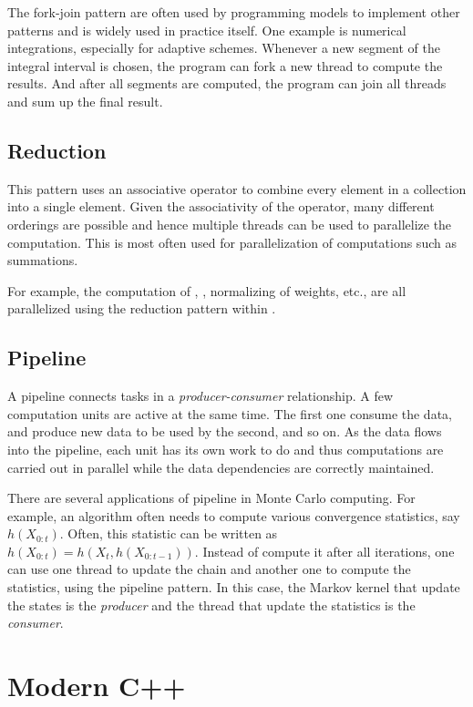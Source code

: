The fork-join pattern are often used by programming models to implement other patterns and is widely used in practice itself. One example is numerical integrations, especially for adaptive schemes. Whenever a new segment of the integral interval is chosen, the program can fork a new thread to compute the results. And after all segments are computed, the program can join all threads and sum up the final result.

\subsection{Reduction}
\label{sub:Reduction}

This pattern uses an associative operator to combine every element in a collection into a single element. Given the associativity of the operator, many different orderings are possible and hence multiple threads can be used to parallelize the computation. This is most often used for parallelization of computations such as summations.

For example, the computation of \ess, \cess, normalizing of weights, etc., are all parallelized using the reduction pattern within \vsmc.

\subsection{Pipeline}
\label{sub:Pipeline}

A pipeline connects tasks in a \emph{producer-consumer} relationship. A few computation units are active at the same time. The first one consume the data, and produce new data to be used by the second, and so on. As the data flows into the pipeline, each unit has its own work to do and thus computations are carried out in parallel while the data dependencies are correctly maintained.

There are several applications of pipeline in Monte Carlo computing. For example, an \mcmc algorithm often needs to compute various convergence statistics, say $h(X_{0:t})$. Often, this statistic can be written as $h(X_{0:t}) = h(X_t, h(X_{0:{t-1}}))$. Instead of compute it after all iterations, one can use one thread to update the \mcmc chain and another one to compute the statistics, using the pipeline pattern. In this case, the Markov kernel that update the states is the \emph{producer} and the thread that update the statistics is the \emph{consumer}.

\section{Modern C++}
\label{sec:Modern C++}

